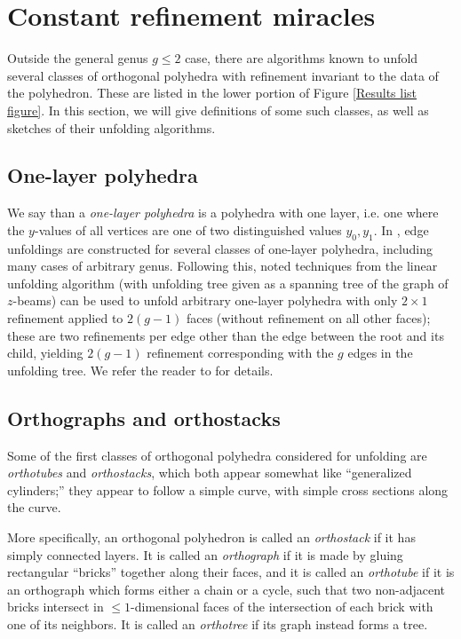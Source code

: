 \documentclass{article}
\begin{document}
\section{Constant refinement miracles}\label{Constant section}
Outside the general genus $g \leq 2$ case, there are algorithms known to unfold several classes of orthogonal polyhedra with refinement invariant to the data of the polyhedron.
These are listed in the lower portion of Figure \ref{Results list figure}.
In this section, we will give definitions of some such classes, as well as sketches of their unfolding algorithms.

\subsection{One-layer polyhedra}\label{Constant one layer subsection}
We say than a \emph{one-layer polyhedra} is a polyhedra with one layer, i.e. one where the $y$-values of all vertices are one of two distinguished values $y_0,y_1$.
In \cite{Liou}, edge unfoldings are constructed for several classes of one-layer polyhedra, including many cases of arbitrary genus.
Following this, \cite{Chang_Yen} noted techniques from the linear unfolding algorithm (with unfolding tree given as a spanning tree of the graph of $z$-beams) can be used to unfold arbitrary one-layer polyhedra with only $2 \times 1$ refinement applied to $2(g-1)$ faces (without refinement on all other faces);
these are two refinements per edge other than the edge between the root and its child, yielding $2(g - 1)$ refinement corresponding with the $g$ edges in the unfolding tree.
We refer the reader to \cite{Chang_Yen} for details.

\subsection{Orthographs and orthostacks} \label{Constant orthograph subsection}
Some of the first classes of orthogonal polyhedra considered for unfolding are \emph{orthotubes} and \emph{orthostacks}, which both appear somewhat like ``generalized cylinders;'' they appear to follow a simple curve, with simple cross sections along the curve.

More specifically, an orthogonal polyhedron is called an \emph{orthostack} if it has simply connected layers. 
It is called an \emph{orthograph} if it is made by gluing rectangular ``bricks'' together along their faces, and it is called an \emph{orthotube} if it is an orthograph which forms either a chain or a cycle, such that two non-adjacent bricks intersect in $\leq 1$-dimensional faces of the intersection of each brick with one of its neighbors.
It is called an \emph{orthotree} if its graph instead forms a tree.
\end{document}
